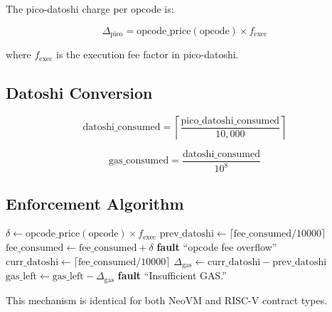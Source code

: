 \documentclass[11pt,a4paper]{article}
\begin{document}
The pico-datoshi charge per opcode is:

\begin{equation}
\Delta_{\text{pico}} = \text{opcode\_price}(\text{opcode}) \times f_{\text{exec}}
\label{eq:gas}
\end{equation}

where $f_{\text{exec}}$ is the execution fee factor in pico-datoshi.

\subsection{Datoshi Conversion}

\begin{equation}
\text{datoshi\_consumed} = \left\lceil \frac{\text{pico\_datoshi\_consumed}}{10{,}000} \right\rceil
\label{eq:datoshi}
\end{equation}

\begin{equation}
\text{gas\_consumed} = \frac{\text{datoshi\_consumed}}{10^8}
\label{eq:gas-convert}
\end{equation}

\subsection{Enforcement Algorithm}

\begin{algorithm}[H]
\caption{ChargeOpcode}
\label{alg:gas}
\begin{algorithmic}[1]
 
    \State \Return
\EndIf
\State $\delta \gets \text{opcode\_price}(\text{opcode}) \times f_{\text{exec}}$
\State $\text{prev\_datoshi} \gets \lceil \text{fee\_consumed} / 10000 \rceil$
\State $\text{fee\_consumed} \gets \text{fee\_consumed} + \delta$
    \State \textbf{fault} ``opcode fee overflow''
\EndIf
\State $\text{curr\_datoshi} \gets \lceil \text{fee\_consumed} / 10000 \rceil$
\State $\Delta_{\text{gas}} \gets \text{curr\_datoshi} - \text{prev\_datoshi}$
\State $\text{gas\_left} \gets \text{gas\_left} - \Delta_{\text{gas}}$
    \State \textbf{fault} ``Insufficient GAS.''
\EndIf
\end{algorithmic}
\end{algorithm}

This mechanism is identical for both NeoVM and RISC-V contract types.

\end{document}
